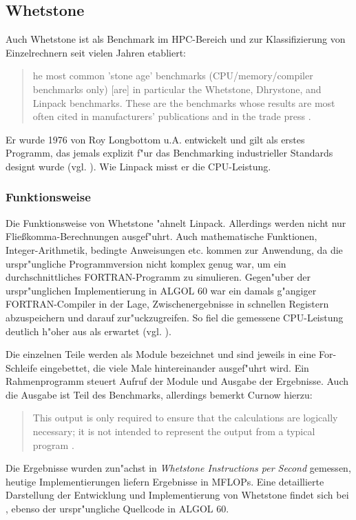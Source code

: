 \subsection{Whetstone}\label{Whetstone}

Auch Whetstone ist als Benchmark im HPC-Bereich und zur Klassifizierung von Einzelrechnern seit vielen Jahren etabliert:
\begin{quote}
\onehalfspacing
[T]he most common 'stone age' benchmarks (CPU/memory/compiler benchmarks only) [are] in particular the Whetstone, Dhrystone, and Linpack benchmarks. These are the benchmarks whose results are most often cited in manufacturers' publications and in the trade press \cite{wei90}.
\end{quote}
Er wurde 1976 von Roy Longbottom u.A. entwickelt und gilt als erstes Programm, das jemals explizit f"ur das Benchmarking industrieller Standards designt wurde (vgl. \cite{wei90}). Wie Linpack misst er die CPU-Leistung. 

\subsubsection{Funktionsweise}\label{Funktion-Whetstone}

Die Funktionsweise von Whetstone "ahnelt Linpack. Allerdings werden nicht nur Flie\ss komma-Berechnungen ausgef"uhrt. Auch mathematische Funktionen, Integer-Arithmetik, bedingte Anweisungen etc. kommen zur Anwendung, da die urspr"ungliche Programmversion nicht komplex genug war, um ein durchschnittliches FORTRAN-Programm zu simulieren. Gegen"uber der urspr"unglichen Implementierung in ALGOL 60 war ein damals g"angiger FOR\-TRAN-Compiler in der Lage, Zwischenergebnisse in schnellen Registern abzuspeichern und darauf zur"uckzugreifen. So fiel die gemessene CPU-Leistung deutlich h"oher aus als erwartet (vgl. \cite{cur76}). 

Die einzelnen Teile werden als Module bezeichnet und sind jeweils in eine For-Schleife eingebettet, die viele Male  hintereinander ausgef"uhrt wird. Ein Rahmenprogramm steuert Aufruf der Module und Ausgabe der Ergebnisse. Auch die Ausgabe ist Teil des Benchmarks, allerdings bemerkt Curnow hierzu: 
\begin{quote}
\onehalfspacing
This output is only required to ensure that the calculations are logically necessary; it is not intended to represent the output from a typical program \cite{cur76}. 
\end{quote}
Die Ergebnisse wurden zun"achst in \textit{Whetstone Instructions per Second} gemessen, heutige Implementierungen liefern Ergebnisse in MFLOPs. Eine detaillierte Darstellung der Entwicklung und Implementierung von Whetstone findet sich bei \cite{cur76}, ebenso der urspr"ungliche Quellcode in ALGOL 60. 

